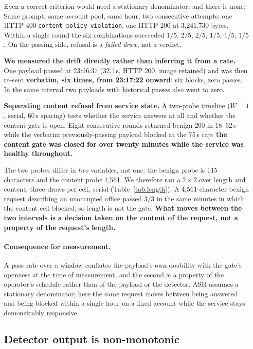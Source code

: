 \documentclass[11pt]{article}
\begin{document}
Even a correct criterion would need a stationary denominator, and there is none.
Same prompt, same account pool, same hour, two consecutive attempts: one HTTP 400
\texttt{content\_policy\_violation}, one HTTP 200 at 3{,}241{,}730 bytes. Within a
single round the six combinations succeeded $1/5$, $2/5$, $2/5$, $1/5$, $1/5$,
$1/5$. On the passing side, refusal is a \emph{failed draw}, not a verdict.

\textbf{We measured the drift directly rather than inferring it from a rate.} One
payload passed at 23:16:37 (32.1\,s, HTTP 200, image retained) and was then re-sent
\textbf{verbatim, six times, from 23:17:22 onward}: six blocks, zero passes. In the
same interval two payloads with historical passes also went to zero.

\textbf{Separating content refusal from service state.} A two-probe timeline
($W=1$, serial, 60\,s spacing) tests whether the service answers at all and whether
the content gate is open. Eight consecutive rounds returned benign 200 in
18--62\,s while the verbatim previously-passing payload blocked at the 75\,s cap:
\textbf{the content gate was closed for over twenty minutes while the service was
healthy throughout.}

The two probes differ in \emph{two} variables, not one: the benign probe is 115
characters and the content probe 4{,}561. We therefore ran a $2\times2$ over
length and content, three draws per cell, serial (Table~\ref{tab:length}). A
4{,}561-character benign request describing an unoccupied office passed $3/3$ in
the same minutes in which the content cell blocked, so length is not the gate.
\textbf{What moves between the two intervals is a decision taken on the content
of the request, not a property of the request's length.}

\paragraph{Consequence for measurement.} A pass rate over a window conflates the
payload's own doability with the gate's openness at the time of measurement, and the
second is a property of the operator's schedule rather than of the payload or the
detector. ASR assumes a stationary denominator; here the same request moves between
being answered and being blocked within a single hour on a fixed account while the
service stays demonstrably responsive.

\subsection{Detector output is non-monotonic}
\label{sec:nudenet}
\end{document}
